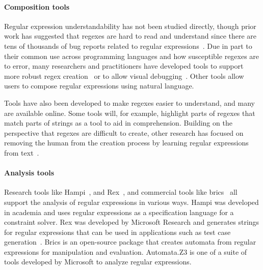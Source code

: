 \paragraph{Composition tools} Regular expression understandability has not been studied directly, though prior work has suggested that regexes are hard to read and understand since there are tens of thousands of bug reports related to regular expressions~\cite{Spishak:2012:TSR:2318202.2318207}.  Due in part to their common use across programming languages and how susceptible regexes are to error, many researchers and practitioners have developed tools to support more robust regex creation~\cite{Spishak:2012:TSR:2318202.2318207} or to allow visual debugging~\cite{Beck:2014:RVD:2591062.2591111}.  Other tools allow users to compose regular expressions using natural language.

Tools have also been developed to make regexes easier to understand, and many are available online. Some tools will, for example, highlight parts of regexes that match parts of strings as a tool to aid in comprehension.  Building on the perspective that regexes are difficult to create, other research has focused on removing the human from the creation process by learning regular expressions from  text~\cite{Babbar:2010:CBA:1871840.1871848, Li:2008:REL:1613715.1613719}.

\paragraph{Analysis tools} Research tools like Hampi~\cite{hampi}, and Rex~\cite{rex}, and commercial tools like brics~\cite{brics} all support the analysis of regular expressions in various ways. Hampi was developed  in academia and uses regular expressions as a specification language for a constraint solver. Rex was developed by Microsoft Research and generates strings for regular expressions that can be used in  applications such as test case generation~\cite{Anand:2013:OSM:2503903.2503991, Tillmann:2014:TAT:2642937.2642941}. Brics is an open-source package that creates automata from regular expressions for manipulation and evaluation. Automata.Z3 is one of a suite of tools developed by Microsoft to analyze regular expressions.

